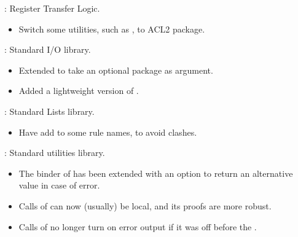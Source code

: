 
\begin{frame}

\implibtitle

:
Register Transfer Logic.
\begin{itemize}
\item Switch some utilities, such as , to ACL2 package.
\end{itemize}

\end{frame}


\begin{frame}

\implibtitle

:
Standard I/O library.
\begin{itemize}
\item Extended 
  to take an optional package as argument.
\item Added a lightweight version of .
\end{itemize}

\end{frame}


\begin{frame}

\implibtitle

:
Standard Lists library.
\begin{itemize}
\item Have  add  to some rule names, to avoid clashes.
\end{itemize}

\end{frame}


\begin{frame}

\implibtitle

:
Standard utilities library.
\begin{itemize}
\item The  binder of  has been extended with
  an option  to return an alternative value in case of error.
\item Calls of  can now (usually) be local, and its proofs are more robust.
\item Calls of  no longer turn on error output if it was off before the .
\end{itemize}

\end{frame}

